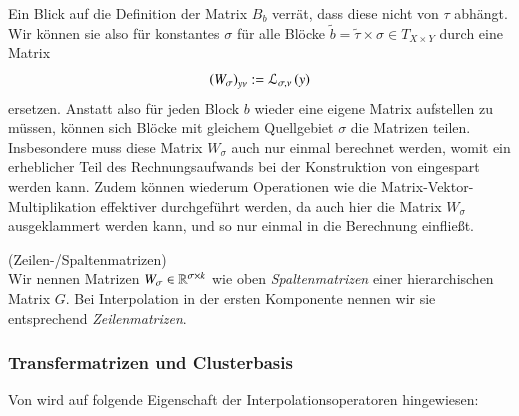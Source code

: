     Ein Blick auf die Definition der Matrix $B_b$ verrät, dass diese nicht von $\tau$ abhängt. Wir können sie also für konstantes $\sigma$ für alle Blöcke 
    $\tilde b = \tilde \tau \times \sigma \in T_{X \times Y}$ durch eine Matrix
    \begin{equation*}
      \left(W_\sigma\right)_{y\nu} := \mathcal{L}_{\sigma, \nu}\left(y\right)
    \end{equation*} 
    ersetzen. Anstatt also für jeden Block $b$ wieder eine eigene Matrix aufstellen zu müssen, können sich Blöcke mit gleichem Quellgebiet $\sigma$ die Matrizen teilen. Insbesondere muss diese 
    Matrix $W_\sigma$ auch nur einmal berechnet werden, womit ein erheblicher Teil des Rechnungsaufwands bei der Konstruktion von \hmat eingespart werden kann. Zudem können wiederum Operationen
    wie die Matrix-Vektor-Multiplikation effektiver durchgeführt werden, da auch hier die Matrix $W_\sigma$ ausgeklammert werden kann, und so nur einmal in die Berechnung einfließt. \citep{nichtlokop}
    
    \begin{defn}
      (Zeilen-/Spaltenmatrizen)\\
      Wir nennen Matrizen $W_\sigma \in \mathbb{R}^{\sigma \times k}$ wie oben \textit{Spaltenmatrizen} einer hierarchischen Matrix $G$. Bei Interpolation in der ersten Komponente nennen wir sie 
      entsprechend \textit{Zeilenmatrizen}.
    \end{defn}

    
    \subsubsection{Transfermatrizen und Clusterbasis}
    \label{sec:transmat}
    Von \citet{h2approxint} wird auf folgende Eigenschaft der Interpolationsoperatoren hingewiesen:
    
    

